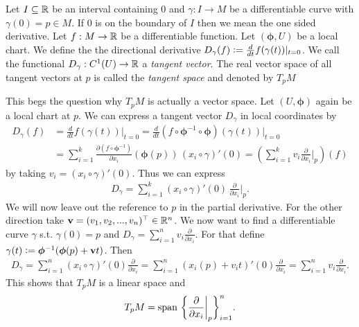 \documentclass[../main.tex]{subfiles}
\begin{document}
\begin{definition}
    Let $I \subseteq \mathbb{R}$ be an interval containing $0$ and 
    $\gamma: I \rightarrow M$ be a differentiable curve with $\gamma(0) = p \in M$.
    If $0$ is on the boundary of $I$ then we mean the one sided derivative.
    Let $f:M \rightarrow \mathbb{R}$ be a differentiable function. Let
    $(\boldsymbol{\phi},U)$ be a local chart.
    We define the the directional derivative 
    $D_\gamma(f) \vcentcolon= \frac{d}{dt} f(\gamma(t)) |_{t=0}$.
    We call the functional $D_\gamma: C^1(U) \rightarrow \mathbb{R}$ 
    a \textit{tangent vector}. 
    The real vector space of all tangent vectors at $p$ is called the 
    \textit{tangent space} and denoted by $T_p M$    
\end{definition}
This begs the question why $T_p M$ is actually a vector space. Let $(U,\boldsymbol{\phi})$ 
again be a local chart at $p$.
We can 
express a tangent vector $D_\gamma$ in local coordinates by 
\begin{align}
    D_\gamma(f) &=  \frac{d}{dt} f(\gamma(t)) \big|_{t=0}
    =  \frac{d}{dt} (f \circ \boldsymbol{\phi}^{-1} \circ \boldsymbol{\phi})  (\gamma(t)) \big|_{t=0}
    \\ &= \sum\limits_{i=1}^k \frac{\partial (f \circ \boldsymbol{\phi}^{-1})}{\partial x_i} 
        (\boldsymbol{\phi}(p))
        \, (x_i\circ \gamma)'(0)
    = (\sum\limits_{i=1}^k v_i  \frac{\partial}{\partial x_i}\Big|_p )(f)
\end{align}
by taking $v_i = (x_i\circ \gamma)'(0)$. Thus we can express 
\begin{align*}
    D_\gamma = \sum\limits_{i=1}^k 
    (x_i \circ \gamma)' (0) \, \frac{\partial}{\partial x_i}\bigg|_p.
\end{align*}
We will now leave out the reference to $p$ in the partial derivative.
For the other direction take $\mathbf{v} = (v_1, v_2, ..., v_n)^\top \in \mathbb{R}^n$. 
We now want to find a differentiable curve $\gamma$ s.t. $\gamma(0) = p$ 
and $D_\gamma = \sum_{i=1}^n v_i \frac{\partial}{\partial x_i}$.
For that define $\gamma(t) \vcentcolon= \boldsymbol{\phi}^{-1} (\boldsymbol{\phi}(p) + \mathbf{v}t)$.
Then
\begin{align*}
    D_\gamma = \sum_{i=1}^n (x_i\circ \gamma)'(0) \frac{\partial}{\partial x_i}
    = \sum_{i=1}^n (x_i(p) + v_i t)'(0) \frac{\partial}{\partial x_i}
    = \sum_{i=1}^n v_i \frac{\partial}{\partial x_i}.
\end{align*}
This shows that $T_p M$ is a linear space and 
\begin{align*}
    T_p M = \operatorname{span}\, 
        \bigg\{ \frac{\partial}{\partial x_i}\bigg|_p \bigg\}_{i=1}^n.
\end{align*}
\end{document}

